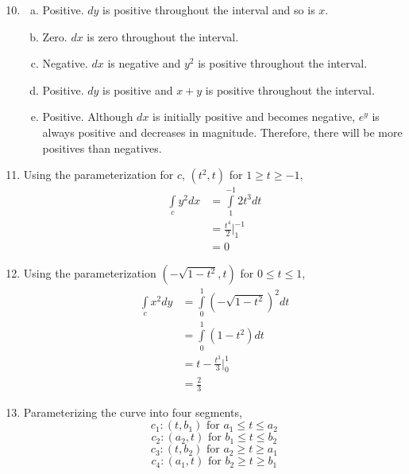 \documentclass{article}
\begin{document}
\begin{enumerate}[1.]
  \setcounter{enumi}{9}
  \item \begin{enumerate}[a.]
    \item Positive. $dy$ is positive throughout the interval and so is $x$.
    \item Zero. $dx$ is zero throughout the interval.
    \item Negative. $dx$ is negative and $y^{2}$ is positive throughout the
      interval.
    \item Positive. $dy$ is positive and $x + y$ is positive throughout the
      interval.
    \item Positive. Although $dx$ is initially positive and becomes negative,
      $e^{y}$ is always positive and decreases in magnitude. Therefore, there
      will be more positives than negatives.
  \end{enumerate}
\item Using the parameterization for $c$, $(t^{2}, t)$ for $1 \geq t \geq -1$,
  \begin{align*}
    \int\limits_{c} y^{2} dx &= \int\limits_{1}^{-1} 2 t^{3} dt \\
                             &= \frac{ t^{4} }{ 2 } \bigg\vert_{1}^{-1} \\
                             &= 0
  \end{align*}
\item Using the parameterization $(-\sqrt{1 - t^{2}}, t)$ for $0 \leq t \leq 1$,
  \begin{align*}
    \int\limits_{c} x^{2} dy &= \int\limits_{0}^{1} (-\sqrt{1 - t^{2}})^{2} dt
    \\
    &= \int\limits_{0}^{1} (1 - t^{2}) dt \\
    &= t - \frac{ t^{3} }{ 3 } \bigg\vert_{0}^{1} \\
    &= \frac{ 2 }{ 3 }
  \end{align*}
\item Parameterizing the curve into four segments,
  $$ c_{1}: (t, b_{1}) \textrm{ for } a_{1} \leq t \leq a_{2} $$
  $$ c_{2}: (a_{2},t) \textrm{ for } b_{1} \leq t \leq b_{2} $$
  $$ c_{3}: (t, b_{2}) \textrm{ for } a_{2} \geq t \geq a_{1} $$
  $$ c_{4}: (a_{1}, t) \textrm{ for } b_{2} \geq t \geq b_{1} $$


\end{enumerate}
\end{document}
